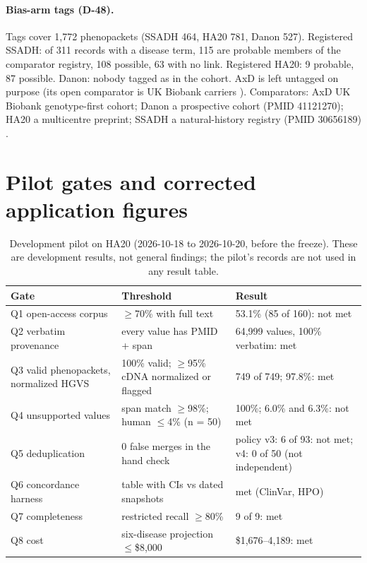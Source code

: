 \documentclass{article} %
\begin{document}
\paragraph{Bias-arm tags (D-48).} Tags cover 1,772 phenopackets (SSADH 464, HA20 781, Danon 527). Registered SSADH: of 311 records with a disease term, 115 are probable members of the comparator registry, 108 possible, 63 with no link. Registered HA20: 9 probable, 87 possible. Danon: nobody tagged as in the cohort. AxD is left untagged on purpose (its open comparator is UK Biobank carriers \citep{gagliardi2024_axd_ukb}). Comparators: AxD UK Biobank genotype-first cohort; Danon a prospective cohort (PMID 41121270); HA20 a multicentre preprint; SSADH a natural-history registry (PMID 30656189) \citep{dibacco2019_ssadh_natural_history}.

\FloatBarrier
\section{Pilot gates and corrected application figures}
\label{app:pilot}
\begin{table}[!htbp]
\caption{Development pilot on HA20 (2026-10-18 to 2026-10-20, before the freeze). These are development results, not general findings; the pilot's records are not used in any result table.}
\begin{center}
\scriptsize
\begin{tabular}{lL{3.5cm}L{5.0cm}}
\toprule
Gate & Threshold & Result \\
\midrule
Q1 open-access corpus & $\geq$70\% with full text & 53.1\% (85 of 160): not met \\
Q2 verbatim provenance & every value has PMID + span & 64,999 values, 100\% verbatim: met \\
Q3 valid phenopackets, normalized HGVS & 100\% valid; $\geq$95\% cDNA normalized or flagged & 749 of 749; 97.8\%: met \\
Q4 unsupported values & span match $\geq$98\%; human $\leq$4\% (n = 50) & 100\%; 6.0\% and 6.3\%: not met \\
Q5 deduplication & 0 false merges in the hand check & policy v3: 6 of 93: not met; v4: 0 of 50 (not independent) \\
Q6 concordance harness & table with CIs vs dated snapshots & met (ClinVar, HPO) \\
Q7 completeness & restricted recall $\geq$80\% & 9 of 9: met \\
Q8 cost & six-disease projection $\leq$\$8,000 & \$1,676--4,189: met \\
\bottomrule
\end{tabular}
\end{center}
\end{table}
\end{document}
